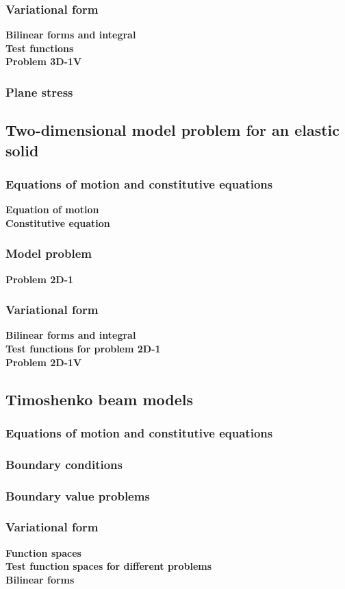 \documentclass[../main.tex]{subfiles}
\begin{document}
\subsubsection{Variational form}
\textbf{Bilinear forms and integral}\\
\textbf{Test functions}\\
\textbf{Problem 3D-1V}
\subsubsection{Plane stress}
\subsection{Two-dimensional model problem for an elastic solid}
\subsubsection{Equations of motion and constitutive equations}
\textbf{Equation of motion}\\
\textbf{Constitutive equation}
\subsubsection{Model problem}
\textbf{Problem 2D-1}
\subsubsection{Variational form}
\textbf{Bilinear forms and integral}\\
\textbf{Test functions for problem 2D-1}\\
\textbf{Problem 2D-1V}
\subsection{Timoshenko beam models}
\subsubsection{Equations of motion and constitutive equations}
\subsubsection{Boundary conditions}
\subsubsection{Boundary value problems}
\subsubsection{Variational form}
\textbf{Function spaces}\\
\textbf{Test function spaces for different problems}\\
\textbf{Bilinear forms}
\end{document}
